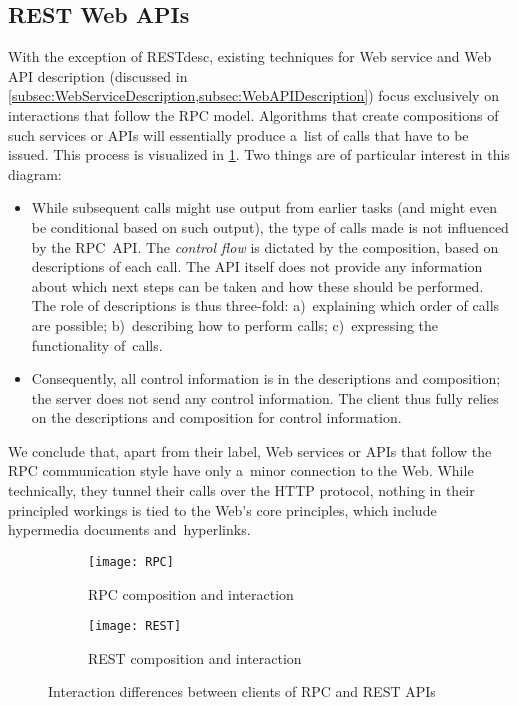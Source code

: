 \subsection{REST Web APIs}
\label{subsec:TechnologiesREST}
With the exception of RESTdesc,
existing techniques for Web service and Web API description
(discussed in \cref{subsec:WebServiceDescription,subsec:WebAPIDescription})
focus exclusively on interactions that follow the RPC model.
Algorithms that create compositions of such services or APIs
will essentially produce a~list of calls that have to be issued.
This process is visualized in \cref{fig:RPC}.
Two things are of particular interest in this diagram:
\begin{itemize}
  \item While subsequent calls might use output from earlier tasks
        (and might even be conditional based on such output),
        the type of calls made is not influenced by the RPC~API.
        The \emph{control flow} is dictated by the composition,
        based on descriptions of each call.
        The API itself does not provide any information
        about which next steps can be taken
        and how these should be performed.
        The role of descriptions is thus three-fold:
        a)~explaining which order of calls are possible;
        b)~describing how to perform calls;
        c)~expressing the functionality of~calls.
  \item Consequently, all control information is in the descriptions and composition;
        the server does not send any control information.
        The client thus fully relies on the descriptions and composition for control information.
\end{itemize}

We conclude that, apart from their label, Web services or APIs that follow the RPC communication style
have only a~minor connection to the Web.
While technically, they tunnel their calls over the HTTP protocol,
nothing in their principled workings is tied to the Web's core principles,
which include hypermedia documents and~hyperlinks.

\begin{figure}[t]
  \begin{subfigure}{0.46\linewidth}
    \texttt{[image: RPC]}
    \caption{RPC composition and interaction}
    \label{fig:RPC}
  \end{subfigure}
  \hfill
  \begin{subfigure}{0.46\linewidth}
    \texttt{[image: REST]}
    \caption{REST composition and interaction}
    \label{fig:REST}
  \end{subfigure}
  \caption{Interaction differences between clients of RPC and REST APIs}
  \label{fig:RPCvsREST}
\end{figure}

